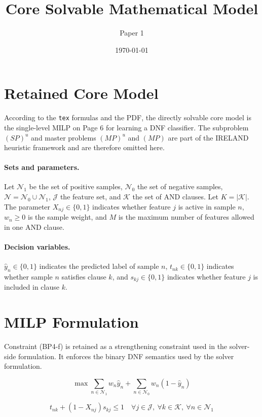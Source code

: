 \documentclass{article}
\title{Core Solvable Mathematical Model}
\author{Paper 1}
\date{\today}
\begin{document}
\maketitle

\section*{Retained Core Model}
According to the \texttt{tex} formulas and the PDF, the directly solvable core model is the
single-level MILP on Page 6 for learning a DNF classifier. The subproblem $(SP)^u$ and
master problems $(MP)^u$ and $(MP)$ are part of the IRELAND heuristic framework and are
therefore omitted here.

\paragraph{Sets and parameters.}
Let $\mathcal{N}_1$ be the set of positive samples, $\mathcal{N}_0$ the set of negative
samples, $\mathcal{N}=\mathcal{N}_0 \cup \mathcal{N}_1$, $\mathcal{J}$ the feature set, and
$\mathcal{K}$ the set of AND clauses. Let $K = |\mathcal{K}|$. The parameter $X_{nj}\in\{0,1\}$
indicates whether feature $j$ is active in sample $n$, $w_n \ge 0$ is the sample weight, and
$M$ is the maximum number of features allowed in one AND clause.

\paragraph{Decision variables.}
$\hat{y}_n \in \{0,1\}$ indicates the predicted label of sample $n$,
$t_{nk} \in \{0,1\}$ indicates whether sample $n$ satisfies clause $k$, and
$s_{kj} \in \{0,1\}$ indicates whether feature $j$ is included in clause $k$.

\section*{MILP Formulation}
Constraint \textup{(BP4-f)} is retained as a strengthening constraint used in the solver-side
formulation. It enforces the binary DNF semantics used by the solver formulation.

\begin{equation}
\max \sum_{n \in \mathcal{N}_1} w_n \hat{y}_n
+ \sum_{n \in \mathcal{N}_0} w_n (1 - \hat{y}_n)
\tag{BP4-Obj}
\end{equation}

\begin{equation}
t_{nk} + (1 - X_{nj}) s_{kj} \le 1
\quad \forall j \in \mathcal{J},\ \forall k \in \mathcal{K},\ \forall n \in \mathcal{N}_1
\tag{BP4-a}
\end{equation}
\end{document}
